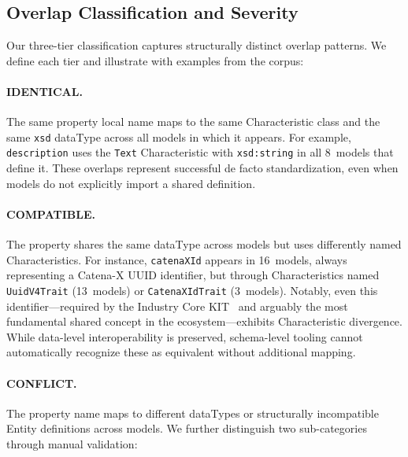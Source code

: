 \documentclass[]{ceurart}
\begin{document}
\subsection{Overlap Classification and Severity}\label{sec:findings-taxonomy}

Our three-tier classification captures structurally distinct overlap
patterns. We define each tier and illustrate with examples from the corpus:

\paragraph{IDENTICAL.} The same property local name maps to the same
Characteristic class and the same \texttt{xsd} dataType across all models
in which it appears. For example, \texttt{description} uses the
\texttt{Text} Characteristic with \texttt{xsd:string} in all 8~models
that define it. These overlaps represent successful de facto
standardization, even when models do not explicitly import a shared
definition.

\paragraph{COMPATIBLE.} The property shares the same dataType across models
but uses differently named Characteristics. For instance,
\texttt{catenaXId} appears in 16~models, always representing a Catena-X
UUID identifier, but through Characteristics named \texttt{UuidV4Trait}
(13~models) or \texttt{CatenaXIdTrait} (3~models). Notably, even this
identifier---required by the Industry Core KIT~\cite{cxindustrycore} and arguably the most
fundamental shared concept in the ecosystem---exhibits Characteristic
divergence. While data-level interoperability is preserved, schema-level
tooling cannot automatically recognize these as equivalent without
additional mapping.

\paragraph{CONFLICT.} The property name maps to different dataTypes or
structurally incompatible Entity definitions across models. We further
distinguish two sub-categories through manual validation:
\end{document}
